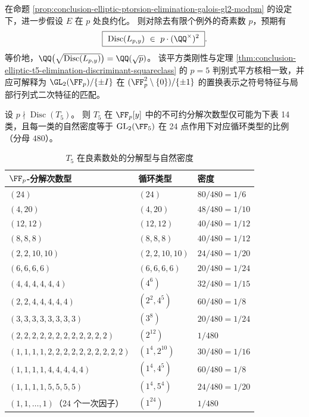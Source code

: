 \begin{conjecture}\label{conj:conclusion-elliptic-ptorsion-discriminant-squareclass-p}
在命题 \ref{prop:conclusion-elliptic-ptorsion-elimination-galois-gl2-modpm} 的设定下，进一步假设 \(E\) 在 \(p\) 处良约化。
则对除去有限个例外的奇素数 \(p\)，预期有
\[
\boxed{\ \mathrm{Disc}(L_{p,y})\ \in\ p\cdot(\QQ^\times)^2\ }.
\]
等价地，\(\QQ\bigl(\sqrt{\mathrm{Disc}(L_{p,y})}\bigr)=\QQ(\sqrt p)\)。
该平方类刚性与定理 \ref{thm:conclusion-elliptic-t5-elimination-discriminant-squareclass} 的 \(p=5\) 判别式平方核相一致，并应可解释为
\(\GL_2(\FF_p)/\{\pm I\}\) 在 \((\FF_p^2\setminus\{0\})/\{\pm1\}\) 的置换表示之符号特征与局部行列式二次特征的匹配。
\end{conjecture}

\begin{theorem}[\(T_5\) 的完整分解型与切比雪夫密度表]\label{thm:conclusion-elliptic-t5-full-chebotarev-splitting-table}
设 \(p\nmid \operatorname{Disc}(T_5)\)。
则 \(T_5\) 在 \(\FF_p[y]\) 中的不可约分解次数型仅可能为下表 14 类，且每一类的自然密度等于
\(\mathrm{GL}_2(\FF_5)\) 在 24 点作用下对应循环类型的比例（分母 \(480\)）。

\begin{table}[H]
\centering
\small
\caption{\(T_5\) 在良素数处的分解型与自然密度}
\label{tab:conclusion-elliptic-t5-factorization-density}
\begin{tabular}{lll}
\toprule
\(\FF_p\)-分解次数型 & 循环类型 & 密度 \\
\midrule
\((24)\) & \((24)\) & \(80/480=1/6\) \\
\((4,20)\) & \((4,20)\) & \(48/480=1/10\) \\
\((12,12)\) & \((12,12)\) & \(40/480=1/12\) \\
\((8,8,8)\) & \((8,8,8)\) & \(40/480=1/12\) \\
\((2,2,10,10)\) & \((2,2,10,10)\) & \(24/480=1/20\) \\
\((6,6,6,6)\) & \((6,6,6,6)\) & \(20/480=1/24\) \\
\((4,4,4,4,4,4)\) & \((4^6)\) & \(32/480=1/15\) \\
\((2,2,4,4,4,4,4)\) & \((2^2,4^5)\) & \(60/480=1/8\) \\
\((3,3,3,3,3,3,3,3)\) & \((3^8)\) & \(20/480=1/24\) \\
\((2,2,2,2,2,2,2,2,2,2,2,2)\) & \((2^{12})\) & \(1/480\) \\
\((1,1,1,1,2,2,2,2,2,2,2,2,2,2)\) & \((1^4,2^{10})\) & \(30/480=1/16\) \\
\((1,1,1,1,4,4,4,4,4)\) & \((1^4,4^5)\) & \(60/480=1/8\) \\
\((1,1,1,1,5,5,5,5)\) & \((1^4,5^4)\) & \(24/480=1/20\) \\
\((1,1,\dots,1)\)（24 个一次因子） & \((1^{24})\) & \(1/480\) \\
\bottomrule
\end{tabular}
\end{table}
\end{theorem}
